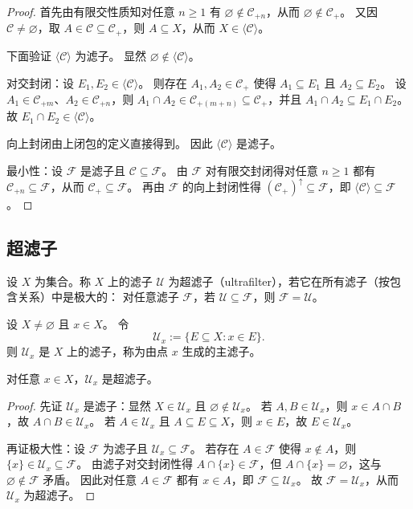 \documentclass[lang=cn,a4paper,newtx,section]{elegantbook}
\begin{document}
\begin{proof}
首先由有限交性质知对任意 $n\ge 1$ 有 $\varnothing\notin\mathcal C_{+n}$，从而 $\varnothing\notin\mathcal C_{+}$。
又因 $\mathcal C\neq\varnothing$，取 $A\in\mathcal C\subseteq\mathcal C_{+}$，则 $A\subseteq X$，从而 $X\in\langle\mathcal C\rangle$。

下面验证 $\langle\mathcal C\rangle$ 为滤子。
显然 $\varnothing\notin\langle\mathcal C\rangle$。

对交封闭：设 $E_1,E_2\in\langle\mathcal C\rangle$。
则存在 $A_1,A_2\in\mathcal C_{+}$ 使得 $A_1\subseteq E_1$ 且 $A_2\subseteq E_2$。
设 $A_1\in\mathcal C_{+m}$、$A_2\in\mathcal C_{+n}$，则 $A_1\cap A_2\in\mathcal C_{+(m+n)}\subseteq\mathcal C_{+}$，并且 $A_1\cap A_2\subseteq E_1\cap E_2$。
故 $E_1\cap E_2\in\langle\mathcal C\rangle$。

向上封闭由上闭包的定义直接得到。
因此 $\langle\mathcal C\rangle$ 是滤子。

最小性：设 $\mathcal F$ 是滤子且 $\mathcal C\subseteq\mathcal F$。
由 $\mathcal F$ 对有限交封闭得对任意 $n\ge 1$ 都有 $\mathcal C_{+n}\subseteq\mathcal F$，从而 $\mathcal C_{+}\subseteq\mathcal F$。
再由 $\mathcal F$ 的向上封闭性得 $(\mathcal C_{+})^{\uparrow}\subseteq\mathcal F$，即 $\langle\mathcal C\rangle\subseteq\mathcal F$。
\end{proof}

\subsection{超滤子}

\begin{definition}[超滤子]
设 $X$ 为集合。称 $X$ 上的滤子 $\mathcal U$ 为超滤子（ultrafilter），若它在所有滤子（按包含关系）中是极大的：
对任意滤子 $\mathcal F$，若 $\mathcal U\subseteq\mathcal F$，则 $\mathcal F=\mathcal U$。
\end{definition}

\begin{example}[主超滤子]
设 $X\neq\varnothing$ 且 $x\in X$。
令
\[
  \mathcal U_x:=\{E\subseteq X: x\in E\}.
\]
则 $\mathcal U_x$ 是 $X$ 上的滤子，称为由点 $x$ 生成的主滤子。
\end{example}

\begin{proposition}
对任意 $x\in X$，$\mathcal U_x$ 是超滤子。
\end{proposition}

\begin{proof}
先证 $\mathcal U_x$ 是滤子：显然 $X\in\mathcal U_x$ 且 $\varnothing\notin\mathcal U_x$。
若 $A,B\in\mathcal U_x$，则 $x\in A\cap B$，故 $A\cap B\in\mathcal U_x$。
若 $A\in\mathcal U_x$ 且 $A\subseteq E\subseteq X$，则 $x\in E$，故 $E\in\mathcal U_x$。

再证极大性：设 $\mathcal F$ 为滤子且 $\mathcal U_x\subseteq\mathcal F$。
若存在 $A\in\mathcal F$ 使得 $x\notin A$，则 $\{x\}\in\mathcal U_x\subseteq\mathcal F$。
由滤子对交封闭性得 $A\cap\{x\}\in\mathcal F$，但 $A\cap\{x\}=\varnothing$，这与 $\varnothing\notin\mathcal F$ 矛盾。
因此对任意 $A\in\mathcal F$ 都有 $x\in A$，即 $\mathcal F\subseteq\mathcal U_x$。
故 $\mathcal F=\mathcal U_x$，从而 $\mathcal U_x$ 为超滤子。
\end{proof}
\end{document}
